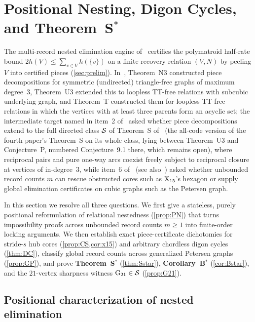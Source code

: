 \section{Positional Nesting, Digon Cycles, and Theorem~S\texorpdfstring{$^*$}{*}}\label{sec:reciprocity}

The multi-record nested elimination engine of~\cite{SeventhPaper2026} certifies the polymatroid half-rate bound
$2 h(V) \le \sum_{v \in V} h(\{v\})$ on a finite recovery relation $(V, N)$ by peeling $V$ into certified pieces
(\cref{sec:prelim}). In~\cite{SeventhPaper2026}, Theorem~N3 constructed piece decompositions for symmetric (undirected)
triangle-free graphs of maximum degree~$3$, Theorem~U3 extended this to loopless TT-free relations with subcubic
underlying graph, and Theorem~T constructed them for loopless TT-free relations in which the vertices with at least
three parents form an acyclic set; the intermediate target named in item~2 of~\cite[Section~9.2]{SeventhPaper2026} asked
whether piece decompositions extend to the full directed class $\mathcal{S}$ of Theorem~S of~\cite[Section~6.6]{FourthPaper2026}
(the all-code version of the fourth paper's Theorem~S on its whole class, lying between Theorem~U3 and Conjecture~P,
numbered Conjecture~9.1 there, which remains open), where reciprocal pairs and pure one-way arcs coexist freely subject to
reciprocal closure at vertices of in-degree~$3$, while item~6 of~\cite[Section~9.2]{SeventhPaper2026} (see
also~\cite[Remarks~7.3 and~7.5]{SeventhPaper2026}) asked whether unbounded record counts $m$ can rescue obstructed cores
such as $\mathrm{X}_{15}$'s hexagon or supply global elimination certificates on cubic graphs such as the Petersen graph.

In this section we resolve all three questions. We first give a stateless, purely positional reformulation of relational
nestedness (\cref{prop:PN}) that turns impossibility proofs across unbounded record counts $m \ge 1$ into finite-order
locking arguments. We then establish exact piece-certificate dichotomies for stride-$s$ hub cores (\cref{prop:CS,cor:x15})
and arbitrary chordless digon cycles (\cref{thm:DC}), classify global record counts across generalized Petersen graphs
(\cref{prop:GP}), and prove \textbf{Theorem~S$^*$} (\cref{thm:Sstar}), \textbf{Corollary~B$^*$} (\cref{cor:Bstar}), and
the $21$-vertex sharpness witness $\mathrm{G}_{21} \in \mathcal{S}$ (\cref{prop:G21}).

\subsection{Positional characterization of nested elimination}\label{sec:reciprocity-pn}

